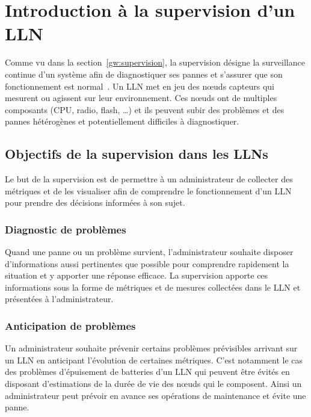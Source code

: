 \section{Introduction à la supervision d'un \ac{LLN}}
\label{supervision:intro}

Comme vu dans la section~\ref{gw:supervision}, la supervision désigne la surveillance continue d'un système afin de diagnostiquer ses pannes et s'assurer que son fonctionnement est normal~\cite{ligus2012effective}.
Un \ac{LLN} met en jeu des nœuds capteurs qui mesurent ou agissent sur leur environnement.
Ces nœuds ont de multiples composants (\ac{CPU}, radio, flash, \ldots) et ils peuvent subir des problèmes et des pannes hétérogènes et potentiellement difficiles à diagnostiquer.

\subsection{Objectifs de la supervision dans les \ac{LLN}s}

Le but de la supervision est de permettre à un administrateur de collecter des métriques et de les visualiser afin de comprendre le fonctionnement d'un \ac{LLN} pour prendre des décisions informées à son sujet.

\subsubsection{Diagnostic de problèmes}

Quand une panne ou un problème survient, l'administrateur souhaite disposer d'informations aussi pertinentes que possible pour comprendre rapidement la situation et y apporter une réponse efficace.
La supervision apporte ces informations sous la forme de métriques et de mesures collectées dans le \ac{LLN} et présentées à l'administrateur.

\subsubsection{Anticipation de problèmes}

Un administrateur souhaite prévenir certains problèmes prévisibles arrivant sur un \ac{LLN} en anticipant l'évolution de certaines métriques.
C'est notamment le cas des problèmes d'épuisement de batteries d'un \ac{LLN} qui peuvent être évités en disposant d'estimations de la durée de vie des nœuds qui le composent.
Ainsi un administrateur peut prévoir en avance ses opérations de maintenance et évite une panne.

